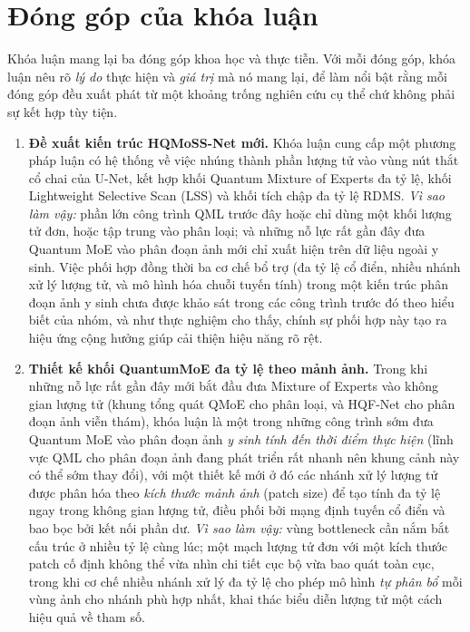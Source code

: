 \section{Đóng góp của khóa luận}
Khóa luận mang lại ba đóng góp khoa học và thực tiễn. Với mỗi đóng góp, khóa luận nêu rõ \emph{lý do} thực hiện và \emph{giá trị} mà nó mang lại, để làm nổi bật rằng mỗi đóng góp đều xuất phát từ một khoảng trống nghiên cứu cụ thể chứ không phải sự kết hợp tùy tiện.
\begin{enumerate}
    \item \textbf{Đề xuất kiến trúc HQMoSS-Net mới.} Khóa luận cung cấp một phương pháp luận có hệ thống về việc nhúng thành phần lượng tử vào vùng nút thắt cổ chai của U-Net, kết hợp khối Quantum Mixture of Experts đa tỷ lệ, khối Lightweight Selective Scan (LSS) và khối tích chập đa tỷ lệ RDMS. \emph{Vì sao làm vậy:} phần lớn công trình QML trước đây hoặc chỉ dùng một khối lượng tử đơn, hoặc tập trung vào phân loại; và những nỗ lực rất gần đây đưa Quantum MoE vào phân đoạn ảnh mới chỉ xuất hiện trên dữ liệu ngoài y sinh. Việc phối hợp đồng thời ba cơ chế bổ trợ (đa tỷ lệ cổ điển, nhiều nhánh xử lý lượng tử, và mô hình hóa chuỗi tuyến tính) trong một kiến trúc phân đoạn ảnh y sinh chưa được khảo sát trong các công trình trước đó theo hiểu biết của nhóm, và như thực nghiệm cho thấy, chính sự phối hợp này tạo ra hiệu ứng cộng hưởng giúp cải thiện hiệu năng rõ rệt.
    \item \textbf{Thiết kế khối QuantumMoE đa tỷ lệ theo mảnh ảnh.} Trong khi những nỗ lực rất gần đây mới bắt đầu đưa Mixture of Experts vào không gian lượng tử (khung tổng quát QMoE \cite{nguyen2025qmoe} cho phân loại, và HQF-Net \cite{hossain2026hqfnet} cho phân đoạn ảnh viễn thám), khóa luận là một trong những công trình sớm đưa Quantum MoE vào phân đoạn ảnh \emph{y sinh} \emph{tính đến thời điểm thực hiện} (lĩnh vực QML cho phân đoạn ảnh đang phát triển rất nhanh nên khung cảnh này có thể sớm thay đổi), với một thiết kế mới ở đó các nhánh xử lý lượng tử được phân hóa theo \emph{kích thước mảnh ảnh} (patch size) để tạo tính đa tỷ lệ ngay trong không gian lượng tử, điều phối bởi mạng định tuyến cổ điển và bao bọc bởi kết nối phần dư. \emph{Vì sao làm vậy:} vùng bottleneck cần nắm bắt cấu trúc ở nhiều tỷ lệ cùng lúc; một mạch lượng tử đơn với một kích thước patch cố định không thể vừa nhìn chi tiết cục bộ vừa bao quát toàn cục, trong khi cơ chế nhiều nhánh xử lý đa tỷ lệ cho phép mô hình \emph{tự phân bổ} mỗi vùng ảnh cho nhánh phù hợp nhất, khai thác biểu diễn lượng tử một cách hiệu quả về tham số.

\end{enumerate}
